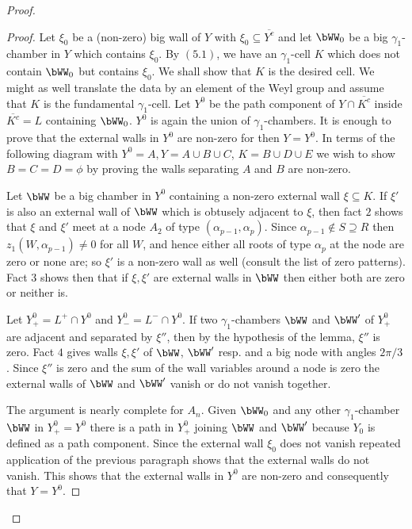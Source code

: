 \documentclass{memo-l}
\theoremstyle{definition}
\theoremstyle{remark}
\numberwithin{section}{chapter}
\numberwithin{equation}{chapter}
\begin{document}
\begin{proof}
\begin{proof}
   Let ${\xi}_{0}$ be a (non-zero) big wall of $Y$ with
${\xi}_{0}{\subseteq} \overline {Y^{c}}$ and let $\bWW_{0}$
be a big
${\gamma}_{1}$-chamber in $Y$ which contains ${\xi}_{0}$.  By $(5.1)$, we
have an ${\gamma}_{1}$-cell $K$ which does not contain
$\bWW_{0}$ but	contains ${\xi}_{0}$.  We shall show
that $K$ is the desired cell.  We
might as well translate the data by an element of the Weyl group and assume
that $K$ is the fundamental ${\gamma}_{1}$-cell.  Let $Y^{0}$ be the path
component of $Y  \cap  \overline {K^{c}}$ inside $\overline {K^{c}} = L$
containing  $\bWW_{0}$.  $Y^{0}$ is again the union of
${\gamma}_{1}$-chambers.  It
is enough to prove that the external walls in $Y^{0}$ are non-zero for then
$Y = Y^{0}$.  In terms of the following diagram with $Y^{0} = A, Y =
A \cup B \cup C$, $K = B \cup D \cup E$ we wish to show $B = C = D =
{\phi}$ by proving the walls separating $A$ and $B$ are non-zero.

\medskip
\medskip

   Let $\bWW$ be a big chamber in $Y^{0}$ containing a non-zero external
wall ${\xi} {\subseteq} K$.  If ${\xi}'$ is also an external wall of
$\bWW$ which is obtusely adjacent to ${\xi}$, then
fact $2$ shows that ${\xi}$
and ${\xi}'$ meet at a node $A_{2}$ of type
$({\alpha}_{p-1},{\alpha}_{p})$.  Since $\alpha_{p-1}\not\in S\supseteq R$ then
$z_1(W,{\alpha}_{p-1})\ne 0$ for all
$W$, and hence either all roots of type ${\alpha}_{p}$ at the node are zero or none
are; so ${\xi}'$ is a non-zero wall as well (consult the list of zero
patterns).  Fact $3$ shows then that if ${\xi}, {\xi}'$ are external walls
in $\bWW$ then either both are zero or neither is.

   Let $Y^{0}_{+} = L^{+} \cap Y^{0}$ and $Y^{0}_{-} = L^{-} \cap Y^{0}$.  If
two ${\gamma}_{1}$-chambers $\bWW$ and $\bWW'$ of $Y^{0}_{+}$ are
adjacent and separated by ${\xi''}$, then by the hypothesis of the lemma,
${\xi''}$ is zero.  Fact $4$ gives walls ${\xi}, {\xi}'$ of $\bWW$,
$\bWW'$ resp.  and a big node with angles $2{\pi}/3$.  Since ${\xi''}$
is zero and the sum of the wall variables around a node is zero the
external walls of $\bWW$ and $\bWW'$
vanish or do not vanish	together.


   The argument is nearly complete for $A_{n}$.  Given $\bWW_{0}$
and any
other ${\gamma}_{1}$-chamber $\bWW$ in $Y^{0}_{+} = Y^{0}$
there is a path
in $Y_{+}^{0}$ joining $\bWW$ and $\bWW'$
because $Y_{0}$ is defined
as a path component.  Since the external wall ${\xi}_{0}$ does not vanish
repeated application of the previous paragraph shows that the external
walls do not vanish.  This shows that the external walls in $Y^{0}$ are
non-zero and consequently that $Y = Y^{0}$.


\end{proof}
\end{proof}
\end{document}
